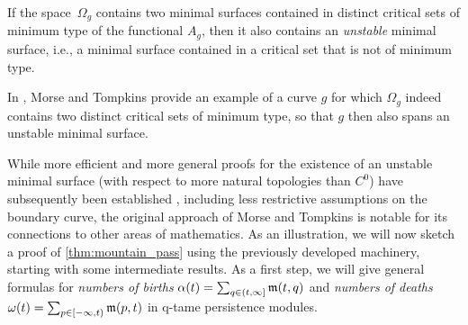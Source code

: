 \begin{thm}
\label{thm:unstable_minimial_surface}
	If the space~$\Omega_g$ contains two minimal surfaces contained in distinct critical sets of minimum type of the functional $A_g$, then it also contains an \emph{unstable} minimal surface, i.e., a minimal surface contained in a critical set that is not of minimum type.
\end{thm}

In \cite[Section 8]{Morse.1939}, Morse and Tompkins provide an example of a curve $g$ for which $\Omega_{g}$ indeed contains two distinct critical sets of minimum type, so that $g$ then also spans an unstable minimal surface.

While more efficient and more general proofs for the existence of an unstable minimal surface (with respect to more natural topologies than $C^0$) have subsequently been established \cite{Struwe.1988,Dierkes.2010}, including less restrictive assumptions on the boundary curve, the original approach of Morse and Tompkins is notable
for its connections to other areas of mathematics.
As an illustration, we will now sketch a proof of \cref{thm:mountain_pass} using the previously developed machinery, starting with some intermediate results.
As a first step, we will give general formulas for \emph{numbers of births} $\alpha(t) = \sum_{q \in (t, \infty]} \mathfrak{m}(t,q)$ and \emph{numbers of deaths} $\omega(t) = \sum_{p \in [-\infty, t)} \mathfrak{m}(p,t)$ in q-tame persistence modules.

